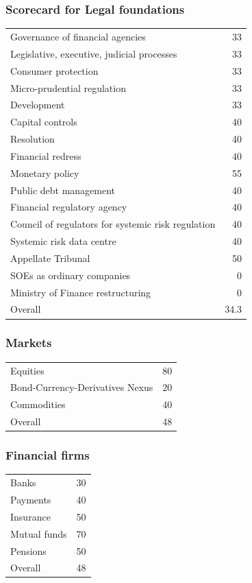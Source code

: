 \documentclass{beamer}
\begin{document}
\begin{frame}
  \frametitle{Scorecard for Legal foundations}
  \begin{center}
    {\small\begin{tabular}{lr}
      \hline
      Governance of financial agencies & 33 \\
      Legislative, executive, judicial processes & 33 \\
      Consumer protection & 33 \\
      Micro-prudential regulation & 33 \\
      Development & 33 \\
      Capital controls & 40 \\
      Resolution & 40 \\
      Financial redress & 40 \\
      Monetary policy & 55 \\
      Public debt management & 40 \\
      Financial regulatory agency & 40 \\
      Council of regulators for systemic risk regulation & 40 \\
      Systemic risk data centre & 40 \\
      Appellate Tribunal & 50 \\
      SOEs as ordinary companies & 0 \\
      Ministry of Finance restructuring & 0 \\
      \hline
      Overall &  34.3 \\
      \hline
    \end{tabular}}
  \end{center}
\end{frame}
\begin{frame}
  \frametitle{Markets}
  \begin{center}
    \begin{tabular}{lr}
      \hline
      Equities & 80 \\
      Bond-Currency-Derivatives Nexus & 20 \\
      Commodities & 40 \\
      \hline
      Overall & 48 \\
      \hline
    \end{tabular}
  \end{center}
\end{frame}
\begin{frame}
  \frametitle{Financial firms}
  \begin{center}
    \begin{tabular}{lr}
      \hline
      Banks & 30 \\
      Payments & 40 \\
      Insurance & 50 \\
      Mutual funds & 70 \\
      Pensions & 50 \\
      \hline
      Overall & 48 \\
      \hline
    \end{tabular}
  \end{center}
\end{frame}
\end{document}
